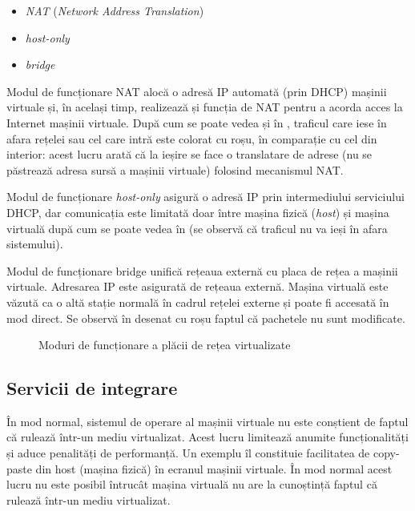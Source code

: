 \begin{itemize}
  \item \textit{NAT} (\textit{Network Address Translation})
  \item \textit{host-only}
  \item \textit{bridge}
\end{itemize}

Modul de funcționare NAT alocă o adresă IP automată (prin DHCP) mașinii virtuale și, în același timp, realizează și funcția de NAT pentru a acorda acces la Internet mașinii virtuale.
După cum se poate vedea și în , traficul care iese în afara rețelei sau cel care intră este colorat cu roșu, în comparație cu cel din interior: acest lucru arată că la ieșire se face o translatare de adrese (nu se păstrează adresa sursă a mașinii virtuale) folosind mecanismul NAT.

Modul de funcționare \textit{host-only} asigură o adresă IP prin intermediului serviciului DHCP, dar comunicația este limitată doar între mașina fizică (\textit{host}) și mașina virtuală după cum se poate vedea în  (se observă că traficul nu va ieși în afara sistemului).

Modul de funcționare bridge unifică rețeaua externă cu placa de rețea a mașinii virtuale.
Adresarea IP este asigurată de rețeaua externă.
Mașina virtuală este văzută ca o altă stație normală în cadrul rețelei externe și poate fi accesată în mod direct.
Se observă în  desenat cu roșu faptul că pachetele nu sunt modificate.

\begin{figure}[htbp]
  \centering
  \def\svgwidth{\columnwidth}
  
  \caption{Moduri de funcționare a plăcii de rețea virtualizate}
  \label{fig:vm:net}
\end{figure}

\subsection{Servicii de integrare}
\label{sec:vm:ops:services}

În mod normal, sistemul de operare al mașinii virtuale nu este conștient de faptul că rulează într-un mediu virtualizat.
Acest lucru limitează anumite funcționalități și aduce penalități de performanță.
Un exemplu îl constituie facilitatea de copy-paste din host (mașina fizică) în ecranul mașinii virtuale.
În mod normal acest lucru nu este posibil întrucât mașina virtuală nu are la cunoștință faptul că rulează într-un mediu virtualizat.


